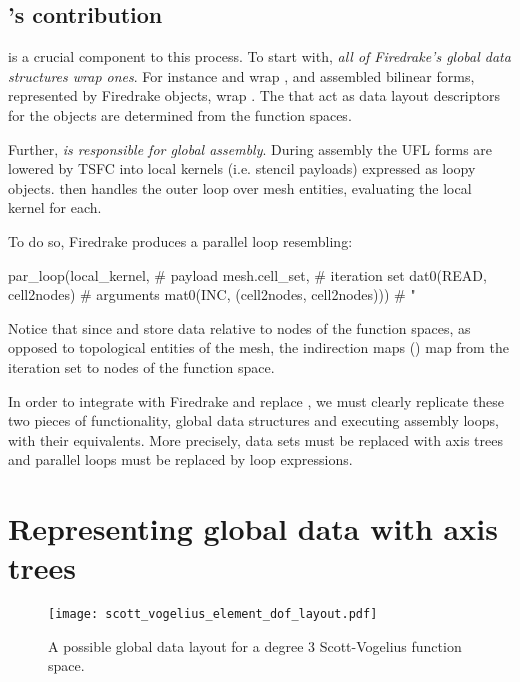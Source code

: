 \documentclass[thesis]{subfiles}
\begin{document}
\subsection{'s contribution}

 is a crucial component to this process.
To start with, \emph{all of Firedrake's global data structures wrap  ones}.
For instance  and  wrap  , and assembled bilinear forms, represented by Firedrake  objects, wrap  .
The  that act as data layout descriptors for the  objects are determined from the function spaces.

Further, \emph{ is responsible for global assembly}.
During assembly the UFL forms are lowered by TSFC into local kernels (i.e. stencil payloads) expressed as loopy  objects.
 then handles the outer loop over mesh entities, evaluating the local kernel for each.

To do so, Firedrake produces a  parallel loop resembling:
\begin{pyinline}
  par_loop(local_kernel,                         # payload
           mesh.cell_set,                        # iteration set
           dat0(READ, cell2nodes)                # arguments
           mat0(INC, (cell2nodes, cell2nodes)))  #   "
\end{pyinline}
Notice that since  and  store data relative to nodes of the function spaces, as opposed to topological entities of the mesh, the indirection maps () map from the iteration set to nodes of the function space.

In order to integrate  with Firedrake and replace , we must clearly replicate these two pieces of functionality, global data structures and executing assembly loops, with their  equivalents.
More precisely,  data sets must be replaced with axis trees and  parallel loops must be replaced by  loop expressions.

\section{Representing global data with axis trees}

\begin{figure}
  \centering
  \texttt{[image: scott\_vogelius\_element\_dof\_layout.pdf]}
  \caption{
    A possible global data layout for a degree 3 Scott-Vogelius function space.
  }
  \label{fig:firedrake_data_tree}
\end{figure}
\end{document}
